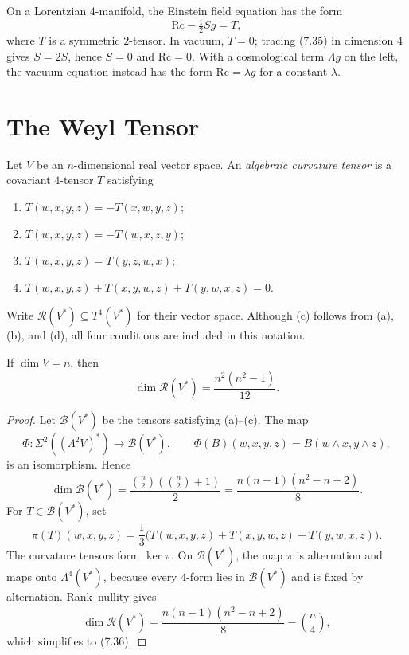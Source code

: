 On a Lorentzian $4$-manifold, the Einstein field equation has the form
\begin{equation}
\mathrm{Rc}-\tfrac12Sg=T,
\tag{7.35}
\end{equation}
where $T$ is a symmetric $2$-tensor. In vacuum, $T=0$; tracing (7.35) in
dimension $4$ gives $S=2S$, hence $S=0$ and $\mathrm{Rc}=0$. With a
cosmological term $\Lambda g$ on the left, the vacuum equation instead has
the form $\mathrm{Rc}=\lambda g$ for a constant $\lambda$.
\section{The Weyl Tensor}

Let $V$ be an $n$-dimensional real vector space.  An \emph{algebraic
curvature tensor} is a covariant $4$-tensor $T$ satisfying
\begin{enumerate}
\item[(a)] $T(w,x,y,z)=-T(x,w,y,z)$;
\item[(b)] $T(w,x,y,z)=-T(w,x,z,y)$;
\item[(c)] $T(w,x,y,z)=T(y,z,w,x)$;
\item[(d)] $T(w,x,y,z)+T(x,y,w,z)+T(y,w,x,z)=0$.
\end{enumerate}
Write $\mathscr R(V^*)\subseteq T^4(V^*)$ for their vector space.  Although
(c) follows from (a), (b), and (d), all four conditions are included in this
notation.

\begin{proposition}
\label{prop:dim-algebraic-curvature-tensors}

If $\dim V=n$, then
\begin{equation}
\dim \mathscr{R}(V^*) = \frac{n^2(n^2-1)}{12}. \tag{7.36}
\end{equation}
\end{proposition}

\begin{proof}
\sketch
Let $\mathscr B(V^*)$ be the tensors satisfying (a)--(c).  The map
\[
\Phi:\Sigma^2((\Lambda^2V)^*)\longrightarrow\mathscr B(V^*),
\qquad
\Phi(B)(w,x,y,z)=B(w\wedge x,y\wedge z),
\]
is an isomorphism.  Hence
\[
\dim\mathscr B(V^*)
=\frac{\binom n2(\binom n2+1)}2
=\frac{n(n-1)(n^2-n+2)}8.
\]
For $T\in\mathscr B(V^*)$, set
\[
\pi(T)(w,x,y,z)=\frac13\bigl(T(w,x,y,z)+T(x,y,w,z)+T(y,w,x,z)\bigr).
\]
The curvature tensors form $\ker\pi$.  On $\mathscr B(V^*)$, the map $\pi$
is alternation and maps onto $\Lambda^4(V^*)$, because every $4$-form lies
in $\mathscr B(V^*)$ and is fixed by alternation.  Rank--nullity gives
\[
\dim\mathscr R(V^*)
=\frac{n(n-1)(n^2-n+2)}8-\binom n4,
\]
which simplifies to (7.36).
\end{proof}

